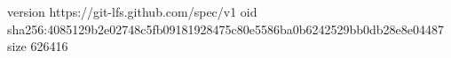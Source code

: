 version https://git-lfs.github.com/spec/v1
oid sha256:4085129b2e02748c5fb09181928475c80e5586ba0b6242529bb0db28e8e04487
size 626416
